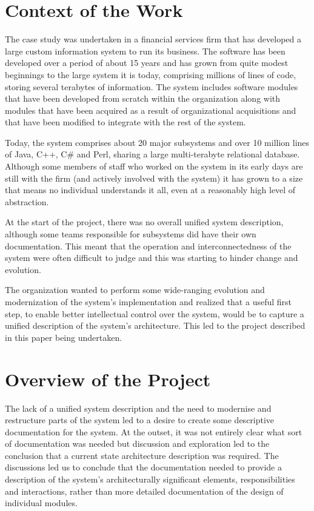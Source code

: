   \section{Context of the Work}

  The case study was undertaken in a financial services firm that has developed a large custom information system to run its business.  The software has been developed over a period of about 15 years and has grown from quite modest beginnings to the large system it is today, comprising millions of lines of code, storing several terabytes of information.  The system includes software modules that have been developed from scratch within the organization along with modules that have been acquired as a result of organizational acquisitions and that have been modified to integrate with the rest of the system.

  Today, the system comprises about 20 major subsystems and over 10 million lines of Java, C++, C\# and Perl, sharing a large multi-terabyte relational database.  Although some members of staff who worked on the system in its early days are still with the firm (and actively involved with the system) it has grown to a size that means no individual understands it all, even at a reasonably high level of abstraction.

  At the start of the project, there was no overall unified system description, although some teams responsible for subsystems did have their own documentation. This meant that the operation and interconnectedness of the system were often difficult to judge and this was starting to hinder change and evolution.

  The organization wanted to perform some wide-ranging evolution and modernization of the system's implementation and realized that a useful first step, to enable better intellectual control over the system, would be to capture a unified description of the system's architecture.  This led to the project described in this paper being undertaken.

\section{Overview of the Project}
\label{sec:overview}

  The lack of a unified system description and the need to modernise and restructure parts of the system led to a desire to create some descriptive documentation for the system.  At the outset, it was not entirely clear what sort of documentation was needed but discussion and exploration led to the conclusion that a current state architecture description was required.  The discussions led us to conclude that the documentation needed to provide a description of the system's architecturally significant elements, responsibilities and interactions, rather than more detailed documentation of the design of individual modules.

